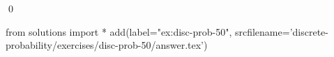 
\begin{ex} 
  \label{ex:disc-prob-50}
  
  \qed
\end{ex} 
\begin{python0}
from solutions import *
add(label="ex:disc-prob-50",
    srcfilename='discrete-probability/exercises/disc-prob-50/answer.tex') 
\end{python0}
